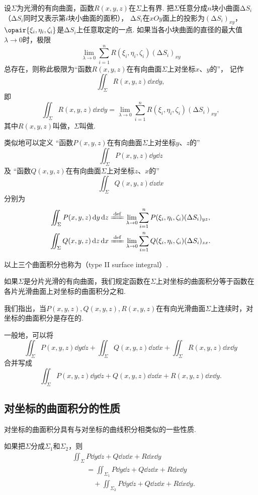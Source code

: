 \begin{definition}
设\(\Sigma\)为光滑的有向曲面，函数\(R(x,y,z)\)在\(\Sigma\)上有界.
把\(\Sigma\)任意分成\(n\)块小曲面\(\increment S_i\)%
（\(\increment S_i\)同时又表示第\(i\)块小曲面的面积），%
\(\increment S_i\)在\(xOy\)面上的投影为\((\increment S_i)_{xy}\)，%
\(\opair{\xi_i,\eta_i,\zeta_i}\)是\(\increment S_i\)上任意取定的一点.
如果当各小块曲面的直径的最大值\(\lambda\to0\)时，极限\[
\lim\limits_{\lambda\to0} \sum\limits_{i=1}^n R(\xi_i,\eta_i,\zeta_i) (\increment S_i)_{xy}
\]总存在，则称此极限为“函数\(R(x,y,z)\)在有向曲面\(\Sigma\)上对坐标\(x\)、\(y\)的”，%
记作\[\iint_{\Sigma} R(x,y,z) \dd{x}\dd{y},\]即\[
\iint_{\Sigma} R(x,y,z) \dd{x}\dd{y}
=\lim\limits_{\lambda\to0} \sum\limits_{i=1}^n R(\xi_i,\eta_i,\zeta_i) (\increment S_i)_{xy},
\]其中\(R(x,y,z)\)叫做，\(\Sigma\)叫做.

类似地可以定义%
“函数\(P(x,y,z)\)在有向曲面\(\Sigma\)上对坐标\(y\)、\(z\)的”\[\iint_{\Sigma} P(x,y,z) \dd{y}\dd{z}\]
及%
“函数\(Q(x,y,z)\)在有向曲面\(\Sigma\)上对坐标\(z\)、\(x\)的”\[\iint_{\Sigma} Q(x,y,z) \dd{z}\dd{x}\]
分别为
\begin{gather*}
\iint_{\Sigma} P(x,y,z) \dd{y}\dd{z}
	\defeq \lim\limits_{\lambda\to0} \sum\limits_{i=1}^n P(\xi_i,\eta_i,\zeta_i) (\increment S_i)_{yz}, \\
\iint_{\Sigma} Q(x,y,z) \dd{z}\dd{x}
	\defeq \lim\limits_{\lambda\to0} \sum\limits_{i=1}^n Q(\xi_i,\eta_i,\zeta_i) (\increment S_i)_{zx}.
\end{gather*}

以上三个曲面积分也称为（type II surface integral）.

如果\(\Sigma\)是分片光滑的有向曲面，我们规定函数在\(\Sigma\)上对坐标的曲面积分等于函数在各片光滑曲面上对坐标的曲面积分之和.
\end{definition}

我们指出，当\(P(x,y,z),Q(x,y,z),R(x,y,z)\)在有向光滑曲面\(\Sigma\)上连续时，对坐标的曲面积分是存在的.

一般地，可以将\[
\iint_{\Sigma} P(x,y,z) \dd{y}\dd{z}
+\iint_{\Sigma} Q(x,y,z) \dd{z}\dd{x}
+\iint_{\Sigma} R(x,y,z) \dd{x}\dd{y}
\]合并写成\[
\iint_{\Sigma}{P(x,y,z)\dd{y}\dd{z}+Q(x,y,z)\dd{z}\dd{x}+R(x,y,z)\dd{x}\dd{y}}.
\]

\subsection{对坐标的曲面积分的性质}
对坐标的曲面积分具有与对坐标的曲线积分相类似的一些性质.
\begin{property}
如果把\(\Sigma\)分成\(\Sigma_1\)和\(\Sigma_2\)，则\begin{align*}
&\iint_{\Sigma}{P\dd{y}\dd{z}+Q\dd{z}\dd{x}+R\dd{x}\dd{y}} \\
&\qquad=\iint_{\Sigma_1}{P\dd{y}\dd{z}+Q\dd{z}\dd{x}+R\dd{x}\dd{y}} \\
&\qquad\quad+\iint_{\Sigma_2}{P\dd{y}\dd{z}+Q\dd{z}\dd{x}+R\dd{x}\dd{y}}.
\end{align*}
\end{property}


